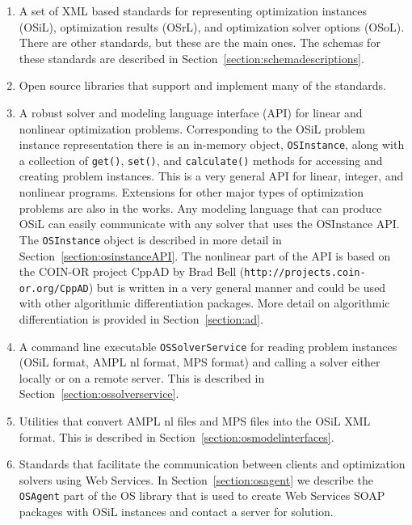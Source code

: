 \documentclass[11pt]{article}
\renewcommand{\_}{{\char"5F}}
\renewcommand{\{}{{\char"7B}}
\renewcommand{\}}{{\char"7D}}
\renewcommand{\^}{{\char"0D}}
\renewcommand{\'}{{\char"0D}}
\newcommand{\UrlCppad}{http://projects.coin-or.org/CppAD}
\begin{document}
\begin{enumerate}
\item{}  A set of XML based standards for representing optimization instances (OSiL), 
optimization results (OSrL), and optimization solver options (OSoL). 
There are other standards, but these are the main ones. 
The schemas for these standards are described in Section~\ref{section:schemadescriptions}.


\item{}  Open source libraries  that support and implement many of the standards.

\item{}  A robust solver and modeling language interface (API) for linear and nonlinear optimization problems.
Corresponding to the OSiL problem instance representation there is an in-memory object,
{\tt OSInstance},
along with a collection of  {\tt get()},   {\tt set()}, and {\tt calculate()} methods for accessing and creating
problem instances. This is a very general API for linear, integer, and nonlinear programs.
Extensions for other major types of optimization problems are also in the works. Any modeling language that can
produce OSiL can easily communicate with any solver that uses the OSInstance API.   
The {\tt OSInstance} object
is described in more detail in Section~\ref{section:osinstanceAPI}. The nonlinear part of the API is based on the
COIN-OR project CppAD by Brad Bell ({\tt\UrlCppad}) but is written in a very general
manner and could be used with other algorithmic differentiation packages. More detail on algorithmic differentiation
is provided in Section~\ref{section:ad}.


\item{}  A  command line executable {\tt OSSolverService}  for reading
problem instances (OSiL format, AMPL  nl format,  
MPS format) and calling a solver either locally or on a remote server.
This is described in Section~\ref{section:ossolverservice}.


\item{} Utilities that convert AMPL nl files  and MPS files into the OSiL XML format.
This is described in Section~\ref{section:osmodelinterfaces}.


\item{}  Standards that facilitate the communication between clients and optimization solvers using Web Services.
In  Section~\ref{section:osagent} we describe the {\tt OSAgent} part of the OS library
that is used to create Web Services SOAP packages with OSiL instances and contact a server for 
solution.


\end{enumerate}
\end{document}
